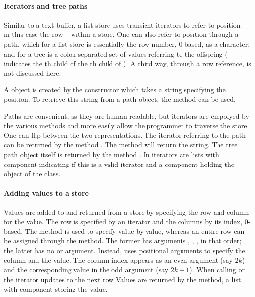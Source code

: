 \paragraph{Iterators and tree paths}
Similar to a text buffer, a list store uses transient iterators to
refer to position -- in this case the row -- within a store. One can
also refer to position through a path, which for a list store is
essentially the row number, $0$-based, as a character; and for a tree
is a colon-separated set of values referring to the offspring
( indicates the th child of the th child
of ).  A third way, through a row reference, is not discussed
here.

A  object is created by the constructor
 which takes a string specifying the
position. To retrieve this string from a path object, the
 method can be used.

Paths are convenient, as they are human readable, but iterators are
empolyed by the various methods and more easily allow the programmer
to traverse the store. One can flip between the two
representations. The iterator referring to the path can be returned by
the method . The method
 will return the string. The
tree path object itself is returned by the method
.  In  iterators are lists
with component  indicating if this is a valid iterator
and a component  holding the object of the
 class.

\paragraph{Adding values to a store}
Values are added to and returned from a store by specifying the row
and column for the value. The row is specified by an iterator and the
columns by its index, $0$-based.  The method
 is used to specify value by value,
whereas an entire row can be assigned through the
 method. The former has arguments
, , , in that order; the latter
has no  or  argument. Instead, 
uses positional arguments to specify the column and the value. The
column index appears as an even argument (say $2k$) and the
corresponding value in the odd argument (say $2k+1$).  When calling
 or  the iterator updates to the next row
Values are returned by the  method,
a list with component  storing the value.

